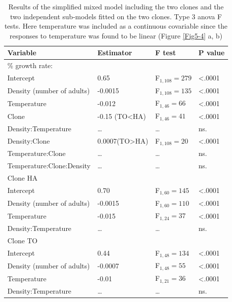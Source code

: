 \begin{table}[!ht]
\centering
\caption{
 	Results of the simplified mixed model including the two
 	clones and the two independent sub-models fitted on the two clones. Type 3 anova F tests. Here
	temperature was included as a continuous covariable since the responses to
	temperature was found to be linear (Figure \ref{Fig5-4} a, b)
 	}\label{tab5-2}
\begin{tabular}{llll}
\hline
Variable & Estimator & F test & P value \\
 \hline \hline
\% growth rate: & & & \\
Intercept & 0.65 & F$_{1,108}=279$ & <.0001\\
Density (number of adults) & -0.0015 & F$_{1,108}=135$ & <.0001\\
Temperature & -0.012 & F$_{1,46}=66$ & <.0001\\
Clone & -0.15 (TO<HA) & F$_{1,46}=41$ & <.0001\\
Density:Temperature & \ldots & \ldots & ns.\\
Density:Clone & 0.0007(TO>HA) & F$_{1,108}=20$ & <.0001 \\
Temperature:Clone & \ldots & \ldots & ns.\\
Temperature:Clone:Density & \ldots & \ldots & ns. \\
\hline
Clone HA & & & \\
Intercept & 0.70 & F$_{1,60}=145$ & <.0001 \\
Density (number of adults) & -0.0015 & F$_{1,60}=110$ & <.0001\\
Temperature & -0.015 & F$_{1,24}=37$ & <.0001\\
Density:Temperature & \ldots & \ldots & ns. \\
\hline
Clone TO & & & \\
Intercept & 0.44 & F$_{1,48}=134$ & <.0001 \\
Density (number of adults) & -0.0007 & F$_{1,48}=55$ & <.0001\\
Temperature & -0.01 & F$_{1,21}=36$ & <.0001\\
Density:Temperature & \ldots & \ldots & ns.\\
\hline \hline
\end{tabular}

\end{table}

